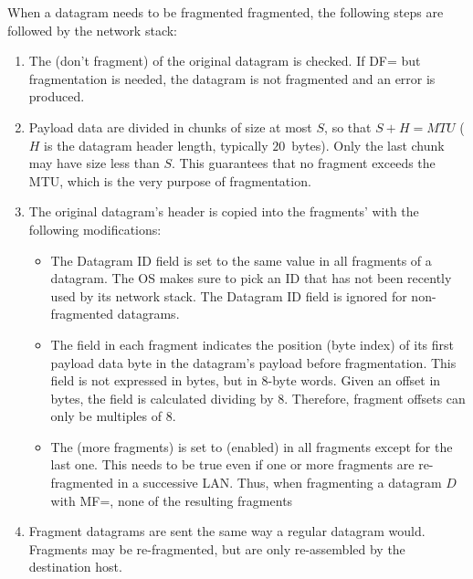 When a datagram needs to be fragmented fragmented, the following steps are followed 
by the network stack:
\begin{enumerate}

\item The  (don't fragment) of the original datagram is checked.
    If DF= but fragmentation is needed, the datagram is not fragmented 
    and an error is produced.\\[-0.2cm]

\item Payload data are divided in chunks of size at most $S$, so that $S + H = MTU$ 
  ($H$ is the datagram header length, typically $20$~bytes). Only the last chunk
  may have size less than $S$. This guarantees that no fragment exceeds the MTU,
  which is the very purpose of fragmentation.\\[-0.2cm]
  
\item The original datagram's header is copied into the fragments' with the following modifications:
  \begin{itemize}
  \item The Datagram ID field is set to the same value in all fragments of a datagram. 
    The OS makes sure to pick an ID that has not been recently used by its network stack.
    The Datagram ID field is ignored for non-fragmented datagrams.\\[-0.3cm]
    
  \item The  field in each fragment indicates the position (byte index)
    of its first payload data byte in the datagram's payload before fragmentation.
    This field is not expressed in bytes, but in $8$-byte words.
    Given an offset in bytes, the  field is calculated dividing by $8$.
    Therefore, fragment offsets can only be multiples of $8$.\\[-0.3cm]
    
  \item The  (more fragments) is set to  (enabled)
    in all fragments except for the last one. This needs to be true even if one or more
    fragments are re-fragmented in a successive LAN. Thus, when fragmenting a 
    datagram $D$ with MF=, none of the resulting fragments\\[-0.2cm]
  \end{itemize}
  
\item Fragment datagrams are sent the same way a regular datagram would.
  Fragments may be re-fragmented, but are only re-assembled by the destination host.
  
\end{enumerate}


